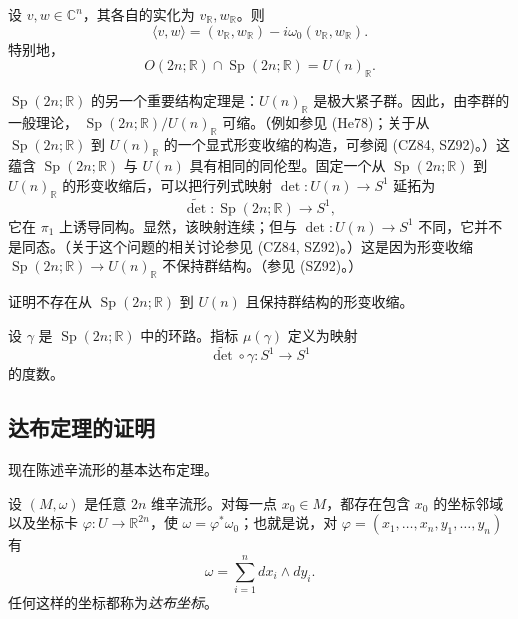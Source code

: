 \begin{lemma}
\label{lem:hermitian-real-symplectic}
设 $v,w\in\mathbb C^n$，其各自的实化为 $v_{\mathbb R},w_{\mathbb R}$。则
\[
  \langle v,w\rangle
  =(v_{\mathbb R},w_{\mathbb R})-i\omega_0(v_{\mathbb R},w_{\mathbb R}).
\]
特别地，
\[
  O(2n;\mathbb R)\cap\operatorname{Sp}(2n;\mathbb R)=U(n)_{\mathbb R}.
\]
\end{lemma}

$\operatorname{Sp}(2n;\mathbb R)$ 的另一个重要结构定理是：$U(n)_{\mathbb R}$ 是极大紧子群。因此，由李群的一般理论，
$\operatorname{Sp}(2n;\mathbb R)/U(n)_{\mathbb R}$ 可缩。（例如参见 (He78)；关于从 $\operatorname{Sp}(2n;\mathbb R)$ 到 $U(n)_{\mathbb R}$ 的一个显式形变收缩的构造，可参阅 (CZ84, SZ92)。）这蕴含 $\operatorname{Sp}(2n;\mathbb R)$ 与 $U(n)$ 具有相同的同伦型。固定一个从 $\operatorname{Sp}(2n;\mathbb R)$ 到 $U(n)_{\mathbb R}$ 的形变收缩后，可以把行列式映射 $\det:U(n)\to S^1$ 延拓为
\[
  \widetilde{\det}:\operatorname{Sp}(2n;\mathbb R)\longrightarrow S^1,
\]
它在 $\pi_1$ 上诱导同构。显然，该映射连续；但与 $\det:U(n)\to S^1$ 不同，它并不是同态。（关于这个问题的相关讨论参见 (CZ84, SZ92)。）这是因为形变收缩 $\operatorname{Sp}(2n;\mathbb R)\to U(n)_{\mathbb R}$ 不保持群结构。（参见 (SZ92)。）

\begin{exercise}
\label{ex:no-group-retraction-sp-u}
证明不存在从 $\operatorname{Sp}(2n;\mathbb R)$ 到 $U(n)$ 且保持群结构的形变收缩。
\end{exercise}

\begin{definition}
\label{def:symplectic-loop-index}
设 $\gamma$ 是 $\operatorname{Sp}(2n;\mathbb R)$ 中的环路。指标 $\mu(\gamma)$ 定义为映射
\[
  \widetilde{\det}\circ\gamma:S^1\longrightarrow S^1
\]
的度数。
\end{definition}

\subsection{达布定理的证明}

现在陈述辛流形的基本达布定理。

\begin{theorem}[达布定理]
\label{thm:darboux}
设 $(M,\omega)$ 是任意 $2n$ 维辛流形。对每一点 $x_0\in M$，都存在包含 $x_0$ 的坐标邻域以及坐标卡 $\varphi:U\to\mathbb R^{2n}$，使 $\omega=\varphi^*\omega_0$；也就是说，对
$\varphi=(x_1,\ldots,x_n,y_1,\ldots,y_n)$ 有
\[
  \omega=\sum_{i=1}^n dx_i\wedge dy_i.
\]
任何这样的坐标都称为\emph{达布坐标}。
\end{theorem}

